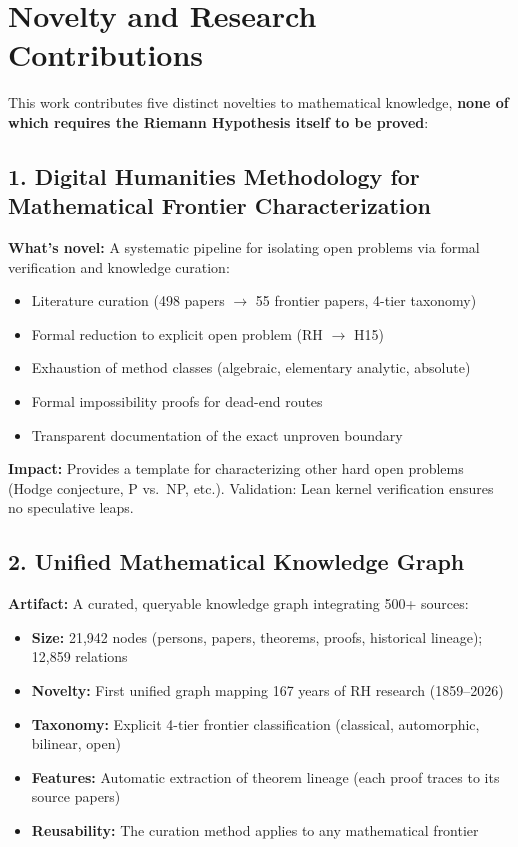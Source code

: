\documentclass[11pt,a4paper]{article}
\theoremstyle{plain}
\theoremstyle{definition}
\theoremstyle{remark}
\begin{document}
\section{Novelty and Research Contributions}
\label{sec:novelty}

This work contributes five distinct novelties to mathematical knowledge, \textbf{none of which requires the Riemann Hypothesis itself to be proved}:

\subsection{1. Digital Humanities Methodology for Mathematical Frontier Characterization}

\textbf{What's novel:} A systematic pipeline for isolating open problems via formal verification and knowledge curation:
\begin{itemize}[leftmargin=2em]
  \item Literature curation (498 papers $\to$ 55 frontier papers, 4-tier taxonomy)
  \item Formal reduction to explicit open problem (RH $\to$ H15)
  \item Exhaustion of method classes (algebraic, elementary analytic, absolute)
  \item Formal impossibility proofs for dead-end routes
  \item Transparent documentation of the exact unproven boundary
\end{itemize}

\textbf{Impact:} Provides a template for characterizing other hard open problems (Hodge conjecture, P vs.~NP, etc.). Validation: Lean kernel verification ensures no speculative leaps.

\subsection{2. Unified Mathematical Knowledge Graph}

\textbf{Artifact:} A curated, queryable knowledge graph integrating 500+ sources:
\begin{itemize}[leftmargin=2em]
  \item \textbf{Size:} 21,942 nodes (persons, papers, theorems, proofs, historical lineage); 12,859 relations
  \item \textbf{Novelty:} First unified graph mapping 167 years of RH research (1859--2026)
  \item \textbf{Taxonomy:} Explicit 4-tier frontier classification (classical, automorphic, bilinear, open)
  \item \textbf{Features:} Automatic extraction of theorem lineage (each proof traces to its source papers)
  \item \textbf{Reusability:} The curation method applies to any mathematical frontier
\end{itemize}
\end{document}
